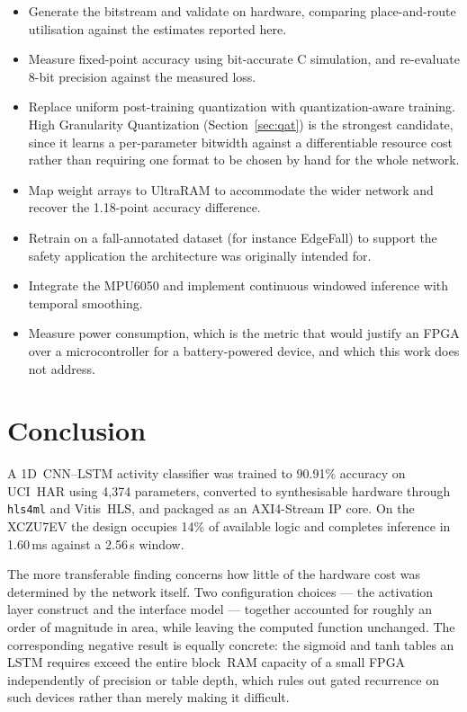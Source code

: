 \documentclass[11pt,a4paper]{article}
\begin{document}
\begin{itemize}
  \item Generate the bitstream and validate on hardware, comparing
        place-and-route utilisation against the estimates reported here.
  \item Measure fixed-point accuracy using bit-accurate C simulation, and
        re-evaluate 8-bit precision against the measured loss.
  \item Replace uniform post-training quantization with quantization-aware
        training. High Granularity Quantization (Section~\ref{sec:qat}) is the
        strongest candidate, since it learns a per-parameter bitwidth against a
        differentiable resource cost rather than requiring one format to be
        chosen by hand for the whole network.
  \item Map weight arrays to UltraRAM to accommodate the wider network and
        recover the 1.18-point accuracy difference.
  \item Retrain on a fall-annotated dataset (for instance EdgeFall) to support
        the safety application the architecture was originally intended for.
  \item Integrate the MPU6050 and implement continuous windowed inference with
        temporal smoothing.
  \item Measure power consumption, which is the metric that would justify an
        FPGA over a microcontroller for a battery-powered device, and which
        this work does not address.
\end{itemize}

\section{Conclusion}

A 1D~CNN--LSTM activity classifier was trained to 90.91\% accuracy on UCI~HAR
using 4{,}374 parameters, converted to synthesisable hardware through
\texttt{hls4ml} and Vitis~HLS, and packaged as an AXI4-Stream IP core. On the
XCZU7EV the design occupies 14\% of available logic and completes inference in
1.60\,ms against a 2.56\,s window.

The more transferable finding concerns how little of the hardware cost was
determined by the network itself. Two configuration choices --- the activation
layer construct and the interface model --- together accounted for roughly an
order of magnitude in area, while leaving the computed function unchanged. The
corresponding negative result is equally concrete: the sigmoid and tanh tables
an LSTM requires exceed the entire block~RAM capacity of a small FPGA
independently of precision or table depth, which rules out gated recurrence on
such devices rather than merely making it difficult.
\end{document}
